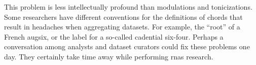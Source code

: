 
This problem is less intellectually profound than
modulations and tonicizations. Some researchers have
different conventions for the definitions of chords that
result in headaches when aggregating datasets. For example,
the ``root'' of a French \gls{augsix}, or the label for a
so-called cadential six-four. Perhaps a conversation among
analysts and dataset curators could fix these problems one
day. They certainly take time away while performing
\glspl{rna} research.

